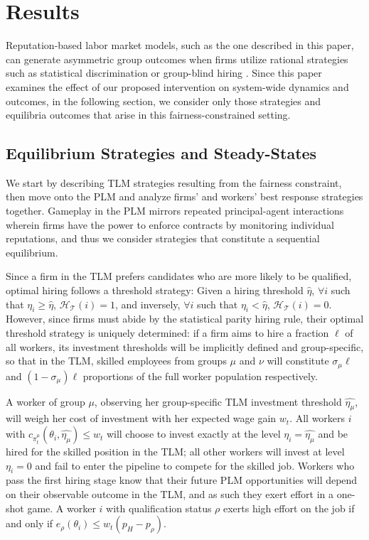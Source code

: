 \documentclass[sigconf]{acmart}
\theoremstyle{definition}
\begin{document}
\section{Results}
Reputation-based labor market models, such as the one described in this paper, can generate asymmetric group outcomes when firms utilize rational strategies such as statistical discrimination or group-blind hiring \cite{arrow1973theory,coate1993will,antonovics2006statistical,chaudhuri2008statistical}. Since this paper examines the effect of our proposed intervention on system-wide dynamics and outcomes, in the following section, we consider only those strategies and equilibria outcomes that arise in this fairness-constrained setting.   

\subsection{Equilibrium Strategies and Steady-States}
We start by describing TLM strategies resulting from the fairness constraint, then move onto the PLM and analyze firms' and workers' best response strategies together. Gameplay in the PLM mirrors repeated principal-agent interactions wherein firms have the power to enforce contracts by monitoring individual reputations, and thus we consider strategies that constitute a sequential equilibrium.

Since a firm in the TLM prefers candidates who are more likely to be qualified, optimal hiring follows a threshold strategy: Given a hiring threshold $\hat{\eta}$, $\forall i$ such that $\eta_i \ge \hat{\eta}$, $\mathcal{H_T}(i) = 1$, and inversely, $\forall i$ such that $\eta_i < \hat{\eta}$, $\mathcal{H_T}(i) = 0$. However, since firms must abide by the statistical parity hiring rule, their optimal threshold strategy is uniquely determined: if a firm aims to hire a fraction $\ell$ of all workers, its investment thresholds will be implicitly defined and group-specific, so that in the TLM, skilled employees from groups $\mu$ and $\nu$ will constitute $\sigma_\mu \ell$ and $(1-\sigma_\mu)\ell$ proportions of the full worker population respectively. 

A worker of group $\mu$, observing her group-specific TLM investment threshold $\widehat{\eta_\mu}$, will weigh her cost of investment with her expected wage gain $w_t$. All workers $i$ with $c_{\pi^{\mu}_{t}}(\theta_i, \widehat{\eta_\mu}) \le w_t$ will choose to invest exactly at the level $\eta_i = \widehat{\eta_\mu}$ and be hired for the skilled position in the TLM; all other workers will invest at level $\eta_i = 0$ and fail to enter the pipeline to compete for the skilled job. Workers who pass the first hiring stage know that their future PLM opportunities will depend on their observable outcome in the TLM, and as such they exert effort in a one-shot game. A worker $i$ with qualification status $\rho$ exerts high effort on the job if and only if $e_\rho(\theta_i) \le w_t (p_H-p_\rho)$.
\end{document}
